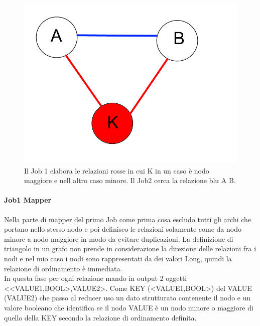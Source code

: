\documentclass[paper=a4, fontsize=11pt]{scrartcl}	%
\numberwithin{equation}{section}															%
\numberwithin{figure}{section}																%
\numberwithin{table}{section}																%
\begin{document}
\begin{figure}[h]
\centering
        \includegraphics[totalheight=6cm]{Graph1.png}
    \caption{Il Job 1 elabora le relazioni rosse in cui K  in un caso \`e nodo  maggiore e nell altro caso minore. Il Job2 cerca la relazione blu A B.}
    \label{fig:verticalcell} 
\end{figure}
\paragraph{Job1 Mapper}
Nella parte di mapper del primo Job come prima cosa escludo tutti gli archi che portano nello stesso nodo e poi definisco le relazioni solamente come da nodo minore a nodo maggiore in modo da evitare duplicazioni. La definizione di triangolo in un grafo non prende in considerazione la direzione delle relazioni fra i nodi e nel mio caso i nodi sono rappresentati da dei valori Long, quindi la relazione di ordinamento \`e immediata.\\ 
In questa fase per ogni relazione mando in output 2 oggetti <<VALUE1,BOOL>,VALUE2>. Come KEY (<VALUE1,BOOL>) del VALUE (VALUE2) che passo al reducer uso un dato strutturato contenente il nodo e un valore booleano che identifica se il nodo VALUE \`e un nodo minore o maggiore di quello della KEY secondo la relazione di ordinamento definita. 
\end{document}
